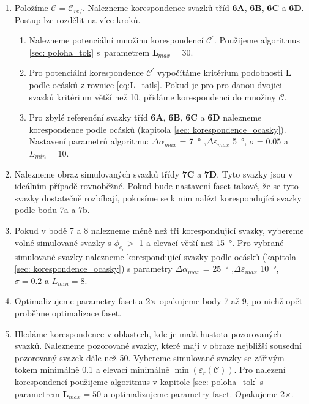 \begin{enumerate}
\item Položíme $\mathcal{C} = \mathcal{C}_{ref}$. Nalezneme korespondence svazků tříd \textbf{6A}, \textbf{6B}, \textbf{6C} a \textbf{6D}. Postup lze rozdělit na více kroků. 

\begin{enumerate}[label={\alph*)}]
	\item Nalezneme potenciální množinu korespondencí $\mathcal{C}^\prime$. Použijeme algoritmus \ref{sec: poloha_tok} s~parametrem  $\mathbf{L}_{max} = 30$.
	
	\item Pro potenciální korespondence $\mathcal{C}^\prime$ vypočítáme kritérium podobnosti $\mathbf{L}$ podle ocásků z rovnice  \ref{eq:L_tails}. Pokud je pro pro danou dvojici svazků kritérium větší než 10, přidáme korespondenci do množiny $\mathcal{C}$. 
	
	\item Pro zbylé referenční svazky tříd \textbf{6A}, \textbf{6B}, \textbf{6C} a \textbf{6D} nalezneme korespondence podle ocásků (kapitola \ref{sec: korespondence_ocasky}). Nastavení parametrů algoritmu: $\Delta\alpha_{max}$ = \SI{7}{\degree} ,$\Delta\varepsilon_{max}$ \SI{5}{\degree}, $\sigma = 0.05$ a $L_{min} = 10$.
\end{enumerate}

\item Nalezneme obraz simulovaných svazků třídy \textbf{7C} a \textbf{7D}. Tyto svazky jsou v ideálním případě rovnoběžné. Pokud bude nastavení faset takové, že se tyto svazky dostatečně rozbíhají, pokusíme se k nim nalézt korespondující svazky podle bodu 7a a 7b. 

\item Pokud v bodě 7 a 8 nalezneme méně než tři korespondující svazky, vybereme volné simulované svazky s $\phi_{e_r} > $ \SI{1}{\permille} a elevací větší než \SI{15}{\degree}. Pro vybrané simulované svazky nalezneme korespondující svazky podle ocásků (kapitola \ref{sec: korespondence_ocasky}) s parametry $\Delta\alpha_{max}$ = \SI{25}{\degree} ,$\Delta\varepsilon_{max}$ \SI{10}{\degree}, $\sigma = 0.2$ a $L_{min} = 8$.

\item Optimalizujeme parametry faset a 2$\times$ opakujeme body 7 až 9, po nichž opět proběhne optimalizace faset.  

\item Hledáme korespondence v oblastech, kde je malá hustota pozorovaných svazků. Nalezneme pozorované svazky, které mají v obraze nejbližší sousední pozorovaný svazek dále než \SI{50}{\px}. Vybereme simulované svazky se zářivým tokem minimálně  \SI{0.1}{\permille} a elevací minimálně $\min(\varepsilon_r(\mathcal{C}))$. Pro nalezení korespondencí použijeme algoritmus v kapitole  \ref{sec: poloha_tok} s parametrem $\mathbf{L}_{max} = 50$ a optimalizujeme parametry faset. Opakujeme 2$\times$.


\end{enumerate}
